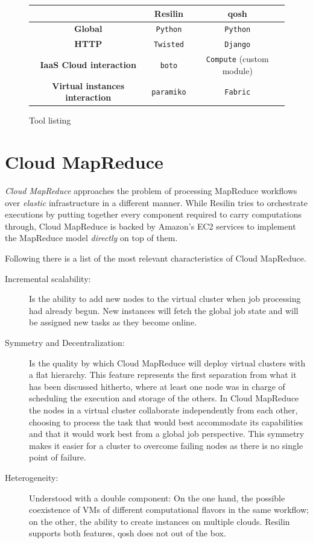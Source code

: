 \begin{figure}[tbp]
\begin{center}
\begin{tabular}{|c|c|c|}
\hline
& \textbf{Resilin} & \textbf{qosh} \\
\hline
\textbf{Global} & \texttt{Python} & \texttt{Python} \\
\hline
\textbf{HTTP} & \texttt{Twisted} & \texttt{Django} \\
\hline
\textbf{IaaS Cloud interaction} & \texttt{boto} & \texttt{Compute} (custom module) \\
\hline
\textbf{Virtual instances interaction} & \texttt{paramiko} & \texttt{Fabric} \\
\hline
\end{tabular}
\caption{Tool listing}
\label{fig:resilinproyecto}
\end{center}
\end{figure}

\section{Cloud MapReduce}\label{sec:cloudmapred}
\noindent \emph{Cloud MapReduce} approaches the problem of processing MapReduce workflows over \emph{elastic} infrastructure in a different manner. While Resilin tries to orchestrate executions by putting together every component required to carry computations through, Cloud MapReduce is backed by Amazon's EC2 services to implement the MapReduce model \cite{googlemapreduce} \emph{directly} on top of them.

Following there is a list of the most relevant characteristics of Cloud MapReduce.

\begin{description}
    \item[Incremental scalability:] Is the ability to add new nodes to the virtual cluster when job processing had already begun. New instances will fetch the global job state and will be assigned new tasks as they become online.
    \item[Symmetry and Decentralization:] Is the quality by which Cloud MapReduce will deploy virtual clusters with a flat hierarchy. This feature represents the first separation from what it has been discussed hitherto, where at least one node was in charge of scheduling the execution and storage of the others. In Cloud MapReduce the nodes in a virtual cluster collaborate independently from each other, choosing to process the task that would best accommodate its capabilities and that it would work best from a global job perspective. This symmetry makes it easier for a cluster to overcome failing nodes as there is no single point of failure.
    \item[Heterogeneity:] Understood with a double component: On the one hand, the possible coexistence of VMs of different computational flavors in the same workflow; on the other, the ability to create instances on multiple clouds. Resilin supports both features, qosh does not out of the box.
\end{description}

